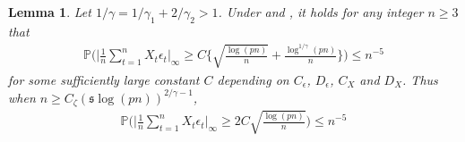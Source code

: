 \documentclass[11pt]{article}
\newcommand{\s}{ { \mathfrak{s}  } }
\newcommand{\p}{\mathbb P}
\theoremstyle{plain}
\newtheorem{lemma}[theorem]{Lemma}
\theoremstyle{definition}
\begin{document}
\begin{lemma}\label{lemma:lasso deviation bound 1}Let 
 $1/\gamma  = 1/\gamma_1  +  2/\gamma_2>1$.
Under  and ,  it holds for any integer $n \geq 3$ that 
\begin{align*}
  \p\bigg(   \bigg | \frac{1}{n}\sum_{t=1}^n X_{t } \epsilon_t  \bigg |_\infty  \ge  C  \bigg\{  \sqrt { \frac{\log(pn) }{n}  }  +   \frac{ \log^{1/\gamma }( pn ) }{n} \bigg \}  \bigg)   \leq   n^{-5}  
\end{align*}  
for some sufficiently large constant $C$ depending on $C_\epsilon$, $D_{\epsilon}$, $C_X$ and $D_{X}$. Thus when $ n \ge C_\zeta( \s \log(pn) )^{2/\gamma-1}$,
\begin{align*}
  \p\bigg(   \bigg | \frac{1}{n}\sum_{t=1}^n X_{t } \epsilon_t  \bigg |_\infty  \ge  2 C     \sqrt { \frac{\log(pn) }{n}  }     \bigg)   \leq   n^{-5}  
\end{align*}  
\end{lemma}  
\end{document}
